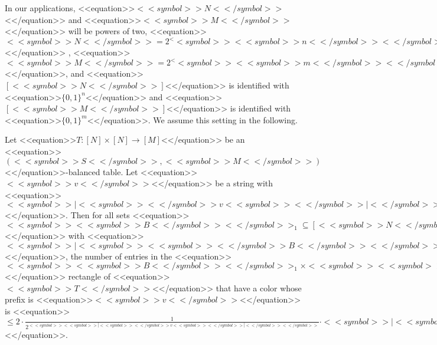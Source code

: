 \documentclass[proceedings]{stacs}
\def\zo{\{0,1\}}
\def\mapping{\rightarrow}
\begin{document}
In our applications, <<equation>>$<<symbol>>N<</symbol>>$<</equation>> and <<equation>>$<<symbol>>M<</symbol>>$<</equation>> will be powers of two, <<equation>>$<<symbol>>N<</symbol>>=2^<<symbol>><<symbol>>n<</symbol>><</symbol>>$<</equation>> , <<equation>>$<<symbol>>M<</symbol>> = 2^<<symbol>><<symbol>>m<</symbol>><</symbol>>$<</equation>>, and <<equation>>$[<<symbol>>N<</symbol>>]$<</equation>> is identified with <<equation>>$\zo^n$<</equation>> and <<equation>>$[<<symbol>>M<</symbol>>]$<</equation>> is identified with <<equation>>$\zo^m$<</equation>>. We assume this setting in the following.
\begin{lemma} 
\label{l-bal-table-refined}
Let <<equation>>$T:  [N] \times [N] \mapping [M]$<</equation>> be an <<equation>>$(<<symbol>>S<</symbol>>,<<symbol>>M<</symbol>>)$<</equation>>-balanced table. Let <<equation>>$<<symbol>>v<</symbol>>$<</equation>> be a string with <<equation>>$<<symbol>>|<<symbol>><</symbol>>v<<symbol>><</symbol>>|<</symbol>> \leq <<symbol>>m<</symbol>>$<</equation>>. Then for all sets <<equation>>$<<symbol>><<symbol>>B<</symbol>><</symbol>>_1 \subseteq [<<symbol>>N<</symbol>>],  <<symbol>><<symbol>>B<</symbol>><</symbol>>_2 \subseteq [<<symbol>>N<</symbol>>]$<</equation>> with <<equation>>$<<symbol>>|<<symbol>><<symbol>><</symbol>>B<</symbol>><</symbol>>_1<<symbol>>|<</symbol>> \geq <<symbol>>S<</symbol>>, <<symbol>>|<<symbol>><<symbol>><</symbol>>B<</symbol>><</symbol>>_2<<symbol>>|<</symbol>> \geq <<symbol>>S<</symbol>>$<</equation>>, the number of entries in the <<equation>>$<<symbol>><<symbol>>B<</symbol>><</symbol>>_1 \times <<symbol>><<symbol>>B<</symbol>><</symbol>>_2$<</equation>> rectangle of <<equation>>$<<symbol>>T<</symbol>>$<</equation>> that have a color whose prefix is <<equation>>$<<symbol>>v<</symbol>>$<</equation>> is  <<equation>>$\leq 2 \cdot \frac{1}{2^{<<symbol>><<symbol>>|<<symbol>><</symbol>>v<<symbol>><</symbol>>|<</symbol>><</symbol>>}} \cdot <<symbol>>|<<symbol>><<symbol>><</symbol>>B<</symbol>><</symbol>>_1 \times <<symbol>><<symbol>>B<</symbol>><</symbol>>_2<<symbol>>|<</symbol>>$<</equation>>.
\end{lemma}
\proof
\end{document}
